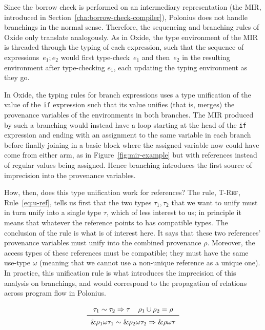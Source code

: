 \documentclass[11pt,a4paper,twoside,openany]{report}
\newcommand{\InRust}[1]{\texttt{#1}}
\newcommand{\expression}[1]{\boxed{#1}}
\newcommand{\ntyperule}[2]{\begin{array}{c}#1\\\midrule\raisebox{1pt}{\strut}#2\end{array}}
\renewcommand\_{\textunderscore\allowbreak}
\begin{document}
Since the borrow check is performed on an intermediary representation (the MIR,
introduced in Section~\ref{cha:borrow-check-compiler}), Polonius does not handle
branchings in the normal sense. Therefore, the sequencing and branching rules of
Oxide only translate analogously. As in Oxide, the type environment of the MIR
is threaded through the typing of each expression, such that the sequence of
expressions~$\expression{e_1; e_2}$ would first type-check~$e_1$ and then~$e_2$
in the resulting environment after type-checking $e_1$, each updating the typing
environment as they go.

In Oxide, the typing rules for branch expressions uses a type unification of the
value of the \InRust{if} expression such that its value unifies (that is,
merges) the provenance variables of the environments in both branches. The MIR
produced by such a branching would instead have a loop starting at the head of
the \InRust{if} expression and ending with an assignment to the same variable in
each branch before finally joining in a basic block where the assigned variable
now could have come from either arm, as in Figure~\ref{fig:mir-example} but with
references instead of regular values being assigned. Hence branching introduces
the first source of imprecision into the provenance variables.

How, then, does this type unification work for references? The rule,
\textsc{T-Ref}, Rule~\eqref{eq:u-ref}, tells us first that the two types
$\tau_1, \tau_2$ that we want to unify must in turn unify into a single type
$\tau$, which of less interest to us; in principle it means that whatever the
reference points to has compatible types. The conclusion of the rule is what is
of interest here. It says that these two references' provenance variables must
unify into the combined provenance $\rho$. Moreover, the access types of these
references must be compatible; they must have the same use-type $\omega$
(meaning that we cannot use a non-unique reference as a unique one). In
practice, this unification rule is what introduces the imprecision of this
analysis on branchings, and would correspond to the propagation of relations
across program flow in Polonius.

\begin{equation}\label{eq:u-ref}
  \ntyperule{
    \tau_1 \sim \tau_2 \Rightarrow \tau \:\:\:\:\: \rho_1 \cup \rho_2 = \rho}
  {
    \&\rho_1 \omega \tau_1 \sim \& \rho_2  \omega \tau_2 \Rightarrow \&\rho \omega \tau
  }
\end{equation}
\end{document}
